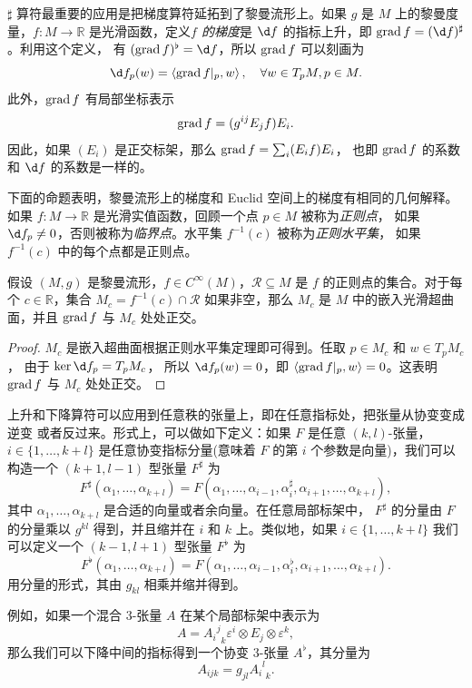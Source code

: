 $\sharp$ 算符最重要的应用是把梯度算符延拓到了黎曼流形上。如果 $g$ 是 $M$
上的黎曼度量，$f:M\to \mathbb{R}$ 是光滑函数，定义\emph{$f$ 的梯度}是
$\d f$ 的指标上升，即 $\grad f=(\d f)^\sharp$。利用这个定义，
有 $(\grad f)^\flat=\d f$，所以 $\operatorname{grad} f$ 可以刻画为
\begin{equation}
  \d f_p(w)=\left\langle \grad f|_p,w\right\rangle,\quad \forall w\in T_pM, p\in M.
\end{equation}
此外，$\operatorname{grad} f$ 有局部坐标表示
\[
  \operatorname{grad} f=(g^{ij}E_j f)E_i.
\]
因此，如果 $(E_i)$ 是正交标架，那么 $\operatorname{grad} f=\sum_i (E_i f) E_i$，
也即 $\operatorname{grad} f$ 的系数和 $\d f$ 的系数是一样的。

下面的命题表明，黎曼流形上的梯度和 Euclid 空间上的梯度有相同的几何解释。
如果 $f:M\to \mathbb{R}$ 是光滑实值函数，回顾一个点 $p\in M$ 被称为\emph{正则点}，
如果 $\d f_p\neq 0$，否则被称为\emph{临界点}。水平集 $f^{-1}(c)$ 被称为\emph{正则水平集}，
如果 $f^{-1}(c)$ 中的每个点都是正则点。

\begin{proposition}
  假设 $(M,g)$ 是黎曼流形，$f\in C^\infty(M)$，$\mathcal{R}\subseteq M$
  是 $f$ 的正则点的集合。对于每个 $c\in \mathbb{R}$，集合 $M_c=f^{-1}(c)\cap \mathcal{R}$
  如果非空，那么 $M_c$ 是 $M$ 中的嵌入光滑超曲面，并且 $\operatorname{grad} f$ 与 $M_c$ 处处正交。
\end{proposition}
\begin{proof}
  $M_c$ 是嵌入超曲面根据正则水平集定理即可得到。任取 $p\in M_c$ 和 $w\in T_pM_c$，
  由于 $\ker \d f_p=T_pM_c$，
  所以 $\d f_p(w)= 0$，即 $\langle \operatorname{grad} f|_p, w \rangle = 0$。这表明 $\operatorname{grad} f$ 与 $M_c$ 处处正交。
\end{proof}

上升和下降算符可以应用到任意秩的张量上，即在任意指标处，把张量从协变变成逆变
或者反过来。形式上，可以做如下定义：如果 $F$ 是任意 $(k,l)$-张量，$i\in\{1,\dots,k+l\}$
是任意协变指标分量(意味着 $F$ 的第 $i$ 个参数是向量)，我们可以构造一个 
$(k+1,l-1)$ 型张量 $F^\sharp$ 为
\[
  F^\sharp(\alpha_1,\dots,\alpha_{k+l})=F(\alpha_1,\dots,\alpha_{i-1},\alpha_i^\sharp,\alpha_{i+1},\dots,\alpha_{k+l}),
\]
其中 $\alpha_1,\dots,\alpha_{k+l}$ 是合适的向量或者余向量。在任意局部标架中，
$F^\sharp$ 的分量由 $F$ 的分量乘以 $g^{kl}$ 得到，并且缩并在 $i$ 和 $k$ 上。类似地，如果 $i\in\{1,\dots,k+l\}$
我们可以定义一个 $(k-1,l+1)$ 型张量 $F^\flat$ 为
\[
  F^\flat(\alpha_1,\dots,\alpha_{k+l})=F(\alpha_1,\dots,\alpha_{i-1},\alpha_i^\flat,\alpha_{i+1},\dots,\alpha_{k+l}).
\]
用分量的形式，其由 $g_{kl}$ 相乘并缩并得到。

例如，如果一个混合 $3$-张量 $A$ 在某个局部标架中表示为
\[
  A={{A_i}^j}_k\varepsilon^i\otimes E_j\otimes \varepsilon^k,
\]
那么我们可以下降中间的指标得到一个协变 $3$-张量 $A^\flat$，其分量为
\[
  A_{ijk}=g_{jl}{{A_i}^l}_k.
\]


